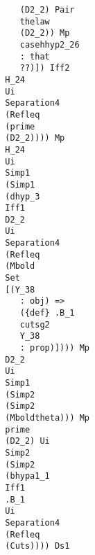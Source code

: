\documentclass[12pt]{article}
\begin{document}
\begin{verbatim}
                                                 (D2_2) Pair 
                                                 thelaw 
                                                 (D2_2)) Mp 
                                                 casehhyp2_26 
                                                 : that 
                                                 ??)]) Iff2 
                                              H_24 
                                              Ui 
                                              Separation4 
                                              (Refleq 
                                              (prime 
                                              (D2_2)))) Mp 
                                              H_24 
                                              Ui 
                                              Simp1 
                                              (Simp1 
                                              (dhyp_3 
                                              Iff1 
                                              D2_2 
                                              Ui 
                                              Separation4 
                                              (Refleq 
                                              (Mbold 
                                              Set 
                                              [(Y_38 
                                                 : obj) => 
                                                 ({def} .B_1 
                                                 cutsg2 
                                                 Y_38 
                                                 : prop)]))) Mp 
                                              D2_2 
                                              Ui 
                                              Simp1 
                                              (Simp2 
                                              (Simp2 
                                              (Mboldtheta))) Mp 
                                              prime 
                                              (D2_2) Ui 
                                              Simp2 
                                              (Simp2 
                                              (bhypa1_1 
                                              Iff1 
                                              .B_1 
                                              Ui 
                                              Separation4 
                                              (Refleq 
                                              (Cuts)))) Ds1 

\end{verbatim}
\end{document}
